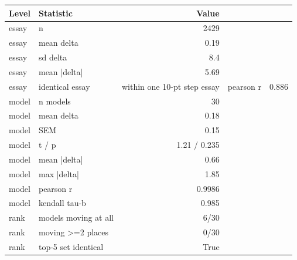\begin{tabular}{llr}
\toprule
Level & Statistic & Value \\
\midrule
essay & n & 2429 \\
essay & mean delta & 0.19 \\
essay & sd delta & 8.4 \\
essay & mean |delta| & 5.69 \\
essay & identical %
essay & within one 10-pt step %
essay & pearson r & 0.886 \\
model & n models & 30 \\
model & mean delta & 0.18 \\
model & SEM & 0.15 \\
model & t / p & 1.21 / 0.235 \\
model & mean |delta| & 0.66 \\
model & max |delta| & 1.85 \\
model & pearson r & 0.9986 \\
model & kendall tau-b & 0.985 \\
rank & models moving at all & 6/30 \\
rank & moving >=2 places & 0/30 \\
rank & top-5 set identical & True \\
\bottomrule
\end{tabular}
